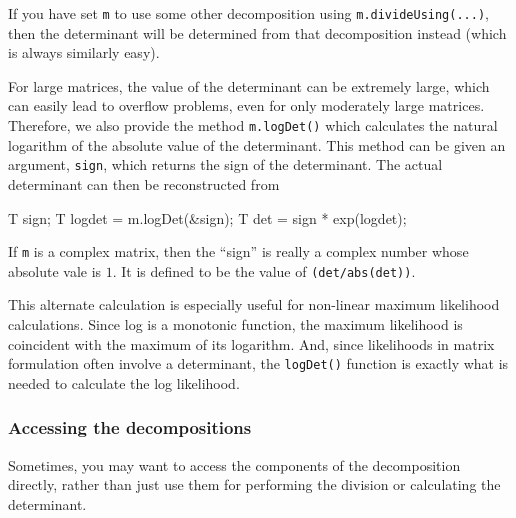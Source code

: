 \documentclass[twoside,letterpaper,11pt]{article}
\renewcommand{\tt}[1]{{\lstinline {#1}}}
\begin{document}
If you have set \tt{m} to use some other decomposition using 
\tt{m.divideUsing(...)},
then the determinant will be determined from that decomposition instead 
(which is always similarly easy).

For large matrices, the value of the determinant can be extremely large, which can easily
lead to overflow problems, even for only moderately large matrices.  Therefore, we
also provide the method \tt{m.logDet()} which calculates the natural logarithm of the
absolute value of the determinant.  This method can be given an argument, \tt{sign},
which returns the sign of the determinant.  The actual determinant can then be 
reconstructed from 
\begin{tmvcode}
T sign;
T logdet = m.logDet(&sign);
T det = sign * exp(logdet);
\end{tmvcode}
If \tt{m} is a complex matrix, then the ``sign'' is really a complex number whose 
absolute vale is $1$. It is defined to be the value of \tt{(det/abs(det))}.

This alternate calculation is especially useful for non-linear maximum likelihood
calculations.  Since log is a monotonic function, the maximum likelihood is coincident
with the maximum of its logarithm.  And, since likelihoods in matrix formulation
often involve a determinant,
the \tt{logDet()} function is exactly what is needed to calculate the log likelihood.

\subsubsection{Accessing the decompositions}

Sometimes, you may want to access the components of the decomposition directly,
rather than just use them for performing the division or calculating the determinant.
\end{document}
